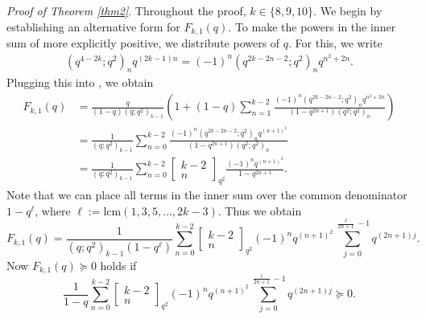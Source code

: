 \documentclass[12pt,reqno]{amsart}
\renewcommand{\(}{\left\(}
\renewcommand{\)}{\right\)}
\numberwithin{equation}{section}
\theoremstyle{plain}
\theoremstyle{definition}
\numberwithin{equation}{section}
\begin{document}
\noindent \emph{Proof of Theorem \ref{thm2}}.  Throughout the proof, $k\!\in\!\{8,9,10\}$. We begin by establishing an alternative form for $F_{k,1}(q)$.  To make the powers in the inner sum of   more explicitly positive, we distribute powers of $q$. For this, we write 
\begin{align*}
	\left(q^{4-2k};q^2\right)_n q^{(2k-1)n} %
= (-1)^n \left(q^{2k-2n-2};q^2\right)_n q^{n^2+2n}.
\end{align*}
Plugging this into , we obtain 
\begin{align*}
F_{k,1}(q) &= \frac{q}{(1-q)(q;q^2)_{k-1}} \left( 1 + (1-q) \sum_{n=1}^{k-2} \frac{(-1)^n \left(q^{2k-2n-2};q^2\right)_n q^{n^2+2n}}{(1-q^{2n+1})(q^2;q^2)_n} \right)\\
	&=\frac{1}{(q;q^2)_{k-1}}\!\sum_{n=0}^{k-2}\!\frac{(-1)^n \left(q^{2k-2n-2};q^2\right)_n q^{(n+1)^2}}{(1-q^{2n+1})(q^2;q^2)_n}\\
	&=\frac{1}{(q;q^2)_{k-1}}\!\sum_{n=0}^{k-2}\!\begin{bmatrix} k-2 \\ n \end{bmatrix}_{q^2}\!\!\! \frac{(-1)^n q^{(n+1)^2}}{1\!-\!q^{2n+1}}.
\end{align*}
Note that we can place all terms in the inner sum over the common denominator $1-q^\ell$, where $\ell := \text{lcm}(1,3,5,\dots,2k-3)$. Thus we obtain
\begin{equation*}%
F_{k,1}(q) = \frac{1}{(q;q^2)_{k-1}(1-q^\ell)} \sum_{n=0}^{k-2} \begin{bmatrix} k-2 \\ n \end{bmatrix}_{q^2}  (-1)^n q^{(n+1)^2}\sum_{j=0}^{\frac{\ell}{2n+1}-1}q^{\left(2n+1\right)j}. %
\end{equation*}
Now $F_{k,1}(q)\succeq0$ holds if 
\begin{equation}\label{neweqn}
\frac{1}{1-q} \sum_{n=0}^{k-2} \begin{bmatrix} k-2 \\ n \end{bmatrix}_{q^2}  (-1)^n q^{(n+1)^2} \sum_{j=0}^{\frac{\ell}{2n+1}-1}q^{\left(2n+1\right)j} \succeq 0.
\end{equation}
\end{document}
